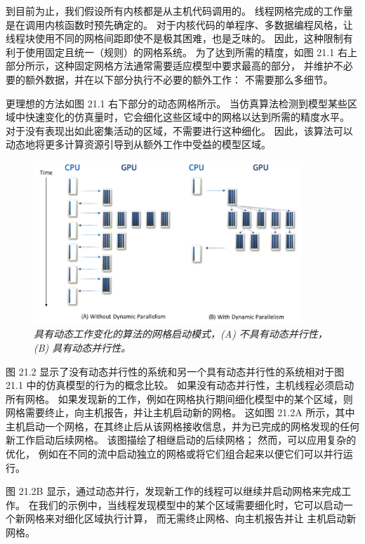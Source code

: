 到目前为止，我们假设所有内核都是从主机代码调用的。 线程网格完成的工作量是在调用内核函数时预先确定的。 
对于内核代码的单程序、多数据编程风格，让线程块使用不同的网格间距即使不是极其困难，也是乏味的。 
因此，这种限制有利于使用固定且统一（规则）的网格系统。 
为了达到所需的精度，如图 21.1 右上部分所示，这种固定网格方法通常需要适应模型中要求最高的部分，
并维护不必要的额外数据，并在以下部分执行不必要的额外工作： 不需要那么多细节。

更理想的方法如图 21.1 右下部分的动态网格所示。 
当仿真算法检测到模型某些区域中快速变化的仿真量时，它会细化这些区域中的网格以达到所需的精度水平。 
对于没有表现出如此密集活动的区域，不需要进行这种细化。 
因此，该算法可以动态地将更多计算资源引导到从额外工作中受益的模型区域。

\begin{figure}[H]
	\centering
	\includegraphics[width=0.9\textwidth]{figs/F21.2.png}
	\caption{\textit{具有动态工作变化的算法的网格启动模式，(A) 不具有动态并行性，(B) 具有动态并行性。}}
\end{figure}

图 21.2 显示了没有动态并行性的系统和另一个具有动态并行性的系统相对于图 21.1 中的仿真模型的行为的概念比较。 
如果没有动态并行性，主机线程必须启动所有网格。 
如果发现新的工作，例如在网格执行期间细化模型中的某个区域，则网格需要终止，向主机报告，并让主机启动新的网格。 
这如图 21.2A 所示，其中主机启动一个网格，在其终止后从该网格接收信息，并为已完成的网格发现的任何新工作启动后续网格。 
该图描绘了相继启动的后续网格； 然而，可以应用复杂的优化，
例如在不同的流中启动独立的网格或将它们组合起来以便它们可以并行运行。

图 21.2B 显示，通过动态并行，发现新工作的线程可以继续并启动网格来完成工作。 
在我们的示例中，当线程发现模型中的某个区域需要细化时，它可以启动一个新网格来对细化区域执行计算，
而无需终止网格、向主机报告并让 主机启动新网格。


